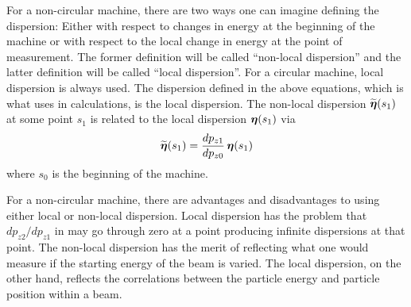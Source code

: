 For a non-circular machine, there are two ways one can imagine defining the dispersion: Either with
respect to changes in energy at the beginning of the machine or with respect to the local change in
energy at the point of measurement. The former definition will be called ``non-local dispersion''
and the latter definition will be called ``local dispersion''. For a circular machine, local
dispersion is always used.  The dispersion defined in the above equations, which is what \bmad uses
in calculations, is the local dispersion. The non-local dispersion $\widetilde{\boldsymbol{\eta}}(s_1)$ at some point
$s_1$ is related to the local dispersion $\boldsymbol{\eta}(s_1)$ via
\begin{equation}
  \widetilde{\boldsymbol{\eta}}(s_1) = \frac{dp_{z1}}{dp_{z0}} \, \boldsymbol{\eta}(s_1)
\end{equation}
where $s_0$ is the beginning of the machine.

For a non-circular machine, there are advantages and disadvantages to using either local or
non-local dispersion. Local dispersion has the problem that $dp_{z2}/dp_{z1}$ in  may go
through zero at a point producing infinite dispersions at that point. The non-local dispersion has
the merit of reflecting what one would measure if the starting energy of the beam is varied. The
local dispersion, on the other hand, reflects the correlations between the particle energy and
particle position within a beam.

